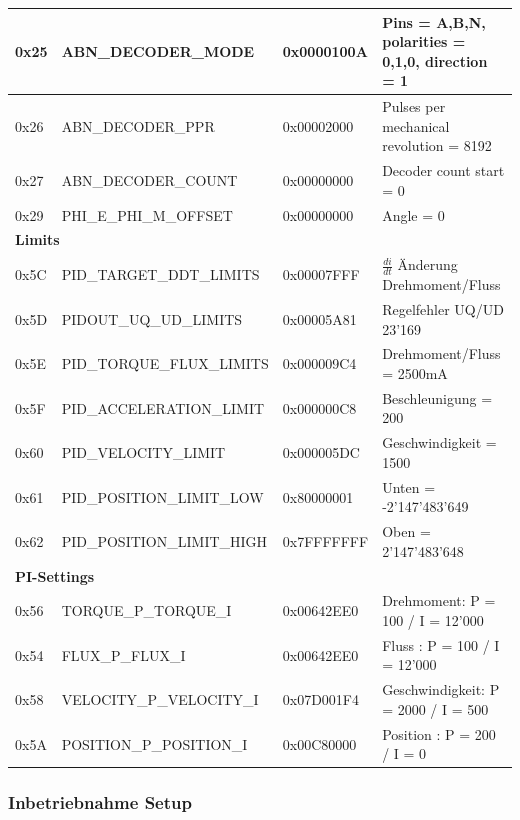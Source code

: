 \begin{table}[H]
\begin{tabularx}{\linewidth}{|l|l|l|X|}
0x25         & ABN\_DECODER\_MODE            & 0x0000100A & Pins = A,B,N, polarities = 0,1,0, direction = 1    \\ \hline
0x26         & ABN\_DECODER\_PPR             & 0x00002000 & Pulses per mechanical revolution = 8192 \\ \hline
0x27         & ABN\_DECODER\_COUNT           & 0x00000000 & Decoder count start = 0 \\ \hline
0x29         & PHI\_E\_PHI\_M\_OFFSET  & 0x00000000 & Angle = 0    \\ \hline
\multicolumn{4}{|l|}{\textbf{Limits}}                         \\ \hline
0x5C         & PID\_TARGET\_DDT\_LIMITS & 0x00007FFF & $\frac{di}{dt}$ Änderung Drehmoment/Fluss   \\ \hline
0x5D         & PIDOUT\_UQ\_UD\_LIMITS         & 0x00005A81 &    Regelfehler UQ/UD 23'169\\ \hline
0x5E         & PID\_TORQUE\_FLUX\_LIMITS      & 0x000009C4 &    Drehmoment/Fluss = 2500mA\\ \hline
0x5F         & PID\_ACCELERATION\_LIMIT      & 0x000000C8 & Beschleunigung = 200     \\ \hline
0x60         & PID\_VELOCITY\_LIMIT          & 0x000005DC & Geschwindigkeit = 1500    \\ \hline
0x61         & PID\_POSITION\_LIMIT\_LOW & 0x80000001 &    Unten = -2'147'483'649 \\ \hline
0x62         & PID\_POSITION\_LIMIT\_HIGH     & 0x7FFFFFFF & Oben  = 2'147'483'648  \\ \hline
\multicolumn{4}{|l|}{\textbf{PI-Settings}}       \\ \hline
0x56         & TORQUE\_P\_TORQUE\_I    & 0x00642EE0 &  Drehmoment: P = 100 / I = 12'000   \\ \hline
0x54         & FLUX\_P\_FLUX\_I  & 0x00642EE0 &  Fluss : P = 100 / I = 12'000   \\ \hline
0x58         & VELOCITY\_P\_VELOCITY\_I  & 0x07D001F4 & Geschwindigkeit: P = 2000 / I = 500    \\ \hline
0x5A         & POSITION\_P\_POSITION\_I  & 0x00C80000 & Position : P = 200 / I = 0    \\ \hline
\end{tabularx}
\end{table}

\subsubsection{Inbetriebnahme Setup}\label{Appendix:ABN_Setup}

